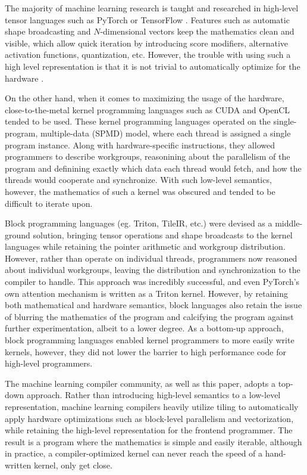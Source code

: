 \documentclass[review, anonymous, sigplan]{acmart}
\begin{document}
The majority of machine learning research is taught and researched in high-level tensor languages such as PyTorch or TensorFlow
. Features such as automatic shape broadcasting and $N$-dimensional vectors keep the mathematics clean and visible, which allow quick iteration by introducing score modifiers, alternative activation functions, quantization, etc. However, the trouble with using such a high level representation is that it is not trivial to automatically optimize for the hardware 
.

On the other hand, when it comes to maximizing the usage of the hardware, close-to-the-metal kernel programming languages such as CUDA and OpenCL tended to be used. These kernel programming languages operated on the single-program, multiple-data (SPMD) model, where each thread is assigned a single program instance. Along with hardware-specific instructions, they allowed programmers to describe workgroups, reasonining about the parallelism of the program and definining exactly which data each thread would fetch, and how the threads would cooperate and synchronize. With such low-level semantics, however, the mathematics of such a kernel was obscured and tended to be difficult to iterate upon.

Block programming languages (eg. Triton, TileIR, etc.) were devised as a middle-ground solution, bringing tensor operations and shape broadcasts to the kernel languages while retaining the pointer arithmetic and workgroup distribution. However, rather than operate on individual threads, programmers now reasoned about individual workgroups, leaving the distribution and synchronization to the compiler to handle. This approach was incredibly successful, and even PyTorch's own attention mechanism is written as a Triton kernel. However, by retaining both mathematical and hardware semantics, block languages also retain the issue of blurring the mathematics of the program and calcifying the program against further experimentation, albeit to a lower degree. As a bottom-up approach, block programming languages enabled kernel programmers to more easily write kernels, however, they did not lower the barrier to high performance code for high-level programmers.

The machine learning compiler community, as well as this paper, adopts a top-down approach. Rather than introducing high-level semantics to a low-level representation, machine learning compilers heavily utilize tiling to automatically apply hardware optimizations such as block-level parallelism and vectorization, while retaining the high-level representation for the frontend programmer. The result is a program where the mathematics is simple and easily iterable, although in practice, a compiler-optimized kernel can never reach the speed of a hand-written kernel, only get close.
\end{document}
